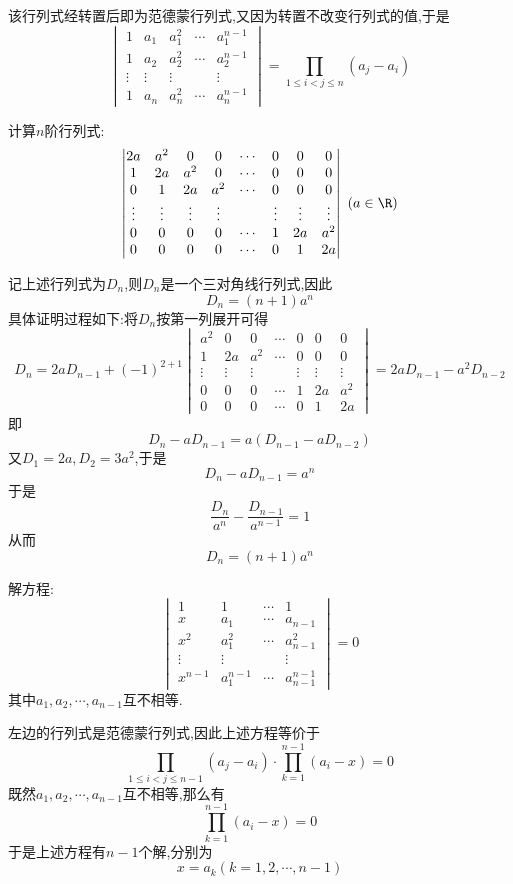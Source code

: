 \documentclass{ctexart}
\begin{document}
\begin{solution}
    该行列式经转置后即为范德蒙行列式,又因为转置不改变行列式的值,于是
    \[\begin{vmatrix}
        1&a_1&a_1^2&\cdots&a_1^{n-1}\\
        1&a_2&a_2^2&\cdots&a_2^{n-1}\\
        \vdots&\vdots&\vdots& &\vdots\\
        1&a_n&a_n^2&\cdots&a_n^{n-1}
    \end{vmatrix}=\prod_{1\leqslant i<j\leqslant n}\left(a_j-a_i\right)\]
\end{solution}
\begin{homework}[6]
    计算$n$阶行列式:
    \[\begin{vmatrix}
        2a&a^2&0&0&\cdots&0&0&0\\
        1&2a&a^2&0&\cdots&0&0&0\\
        0&1&2a&a^2&\cdots&0&0&0\\
        \vdots&\vdots&\vdots&\vdots& &\vdots&\vdots&\vdots\\
        0&0&0&0&\cdots&1&2a&a^2\\
        0&0&0&0&\cdots&0&1&2a
    \end{vmatrix}\ (a\in\R)\]
\end{homework}
\begin{solution}
    记上述行列式为$D_n$,则$D_n$是一个三对角线行列式,因此
    \[D_n=(n+1)a^n\]
    具体证明过程如下:将$D_n$按第一列展开可得
    \[D_n=2aD_{n-1}+(-1)^{2+1}\begin{vmatrix}
        a^2&0&0&\cdots&0&0&0\\
        1&2a&a^2&\cdots&0&0&0\\
        \vdots&\vdots&\vdots& &\vdots&\vdots&\vdots\\
        0&0&0&\cdots&1&2a&a^2\\
        0&0&0&\cdots&0&1&2a
    \end{vmatrix}=2aD_{n-1}-a^2D_{n-2}\]
    即
    \[D_n-aD_{n-1}=a\left(D_{n-1}-aD_{n-2}\right)\]
    又$D_1=2a,D_2=3a^2$,于是
    \[D_n-aD_{n-1}=a^n\]
    于是
    \[\dfrac{D_n}{a^n}-\dfrac{D_{n-1}}{a^{n-1}}=1\]
    从而
    \[D_n=(n+1)a^n\]
\end{solution}
\begin{homework}[7]
    解方程:
    \[\begin{vmatrix}
        1&1&\cdots&1\\
        x&a_1&\cdots&a_{n-1}\\
        x^2&a_1^2&\cdots&a_{n-1}^2\\
        \vdots&\vdots& &\vdots\\
        x^{n-1}&a_1^{n-1}&\cdots&a_{n-1}^{n-1}
    \end{vmatrix}=0\]
    其中$a_1,a_2,\cdots,a_{n-1}$互不相等.
\end{homework}
\begin{solution}
    左边的行列式是范德蒙行列式,因此上述方程等价于
    \[\prod_{1\leqslant i<j\leqslant n-1}\left(a_j-a_i\right)\cdot\prod_{k=1}^{n-1}\left(a_i-x\right)=0\]
    既然$a_1,a_2,\cdots,a_{n-1}$互不相等,那么有
    \[\prod_{k=1}^{n-1}\left(a_i-x\right)=0\]
    于是上述方程有$n-1$个解,分别为
    \[x=a_k(k=1,2,\cdots,n-1)\]
\end{solution}
\end{document}

